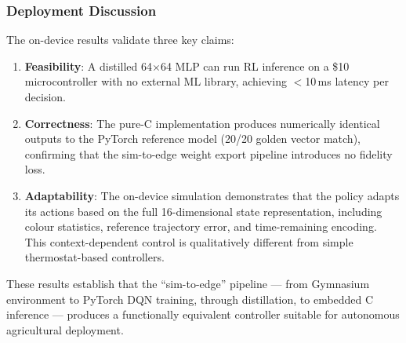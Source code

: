 \subsubsection{Deployment Discussion}

The on-device results validate three key claims:

\begin{enumerate}
    \item \textbf{Feasibility}: A distilled 64$\times$64 MLP can run RL inference on a \$10 microcontroller with no external ML library, achieving $<$10\,ms latency per decision.

    \item \textbf{Correctness}: The pure-C implementation produces numerically identical outputs to the PyTorch reference model (20/20 golden vector match), confirming that the sim-to-edge weight export pipeline introduces no fidelity loss.

    \item \textbf{Adaptability}: The on-device simulation demonstrates that the policy adapts its actions based on the full 16-dimensional state representation, including colour statistics, reference trajectory error, and time-remaining encoding. This context-dependent control is qualitatively different from simple thermostat-based controllers.
\end{enumerate}

These results establish that the ``sim-to-edge'' pipeline --- from Gymnasium environment to PyTorch DQN training, through distillation, to embedded C inference --- produces a functionally equivalent controller suitable for autonomous agricultural deployment.
